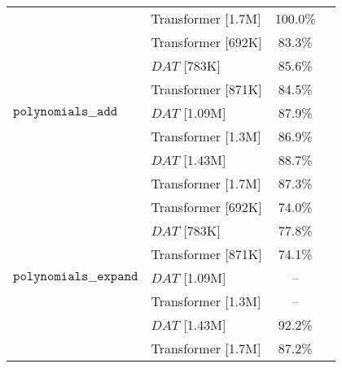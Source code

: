 \begin{tabular}{l|l|cc}
                                 & Transformer [1.7M] &                   100.0\% \\
\cline{1-3}
\multirow{7}{*}{$\texttt{polynomials\_\_add}$} & Transformer [692K] &                    83.3\% \\
                                 & $DAT$ [783K] &                    85.6\% \\
                                 & Transformer [871K] &                    84.5\% \\
                                 & $DAT$ [1.09M] &                    87.9\% \\
                                 & Transformer [1.3M] &                    86.9\% \\
                                 & $DAT$ [1.43M] &                    88.7\% \\
                                 & Transformer [1.7M] &                    87.3\% \\
\cline{1-3}
\multirow{7}{*}{$\texttt{polynomials\_\_expand}$} & Transformer [692K] &                    74.0\% \\
                                 & $DAT$ [783K] &                    77.8\% \\
                                 & Transformer [871K] &                    74.1\% \\
                                 & $DAT$ [1.09M] &                        -- \\
                                 & Transformer [1.3M] &                        -- \\
                                 & $DAT$ [1.43M] &                    92.2\% \\
                                 & Transformer [1.7M] &                    87.2\% \\
\bottomrule
\end{tabular}
